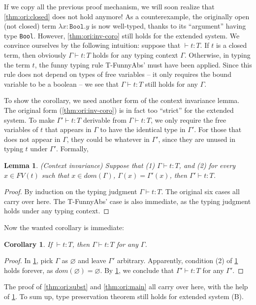 \documentclass[11pt]{article}
\newtheorem{lemma}{Lemma}
\newtheorem{corollary}{Corollary}
\let\t\texttt
\let\emptyset\varnothing
\newcommand{\Bool}{\t{Bool}}
\begin{document}
If we copy all the previous proof mechanism, we will soon realize that \cref{thm:ori:closed} does not hold anymore!
As a counterexample, the originally open (not closed) term $\lambda x:\Bool.y$ is now well-typed, thanks to its ``argument'' having type \Bool.
However, \cref{thm:ori:inv-coro} still holds for the extended system.
We convince ourselves by the following intuition: suppose that $\vdash t:T$.
If $t$ is a closed term, then obviously $\Gamma \vdash t:T$ holds for any typing context $\Gamma$.
Otherwise, in typing the term $t$, the funny typing rule T-FunnyAbs' must have been applied.
Since this rule does not depend on types of free variables -- it only requires the bound variable to be a boolean -- we see that $\Gamma \vdash t:T$ still holds for any $\Gamma$.

To show the corollary, we need another form of the context invariance lemma.
The original form (\cref{thm:ori:inv-coro}) is in fact too ``strict'' for the extended system.
To make $\Gamma' \vdash t:T$ derivable from $\Gamma \vdash t:T$, we only require the free variables of $t$ that appears in $\Gamma$ to have the identical type in $\Gamma'$.
For those that does not appear in $\Gamma$, they could be whatever in $\Gamma'$, since they are unused in typing $t$ under $\Gamma'$. Formally,
\begin{lemma}\label{thm:ext:inv}
    (Context invariance) Suppose that (1) $\Gamma \vdash t:T$, and (2) for every $x\in FV(t)$ such that $x\in dom(\Gamma)$, $\Gamma(x)=\Gamma'(x)$, then $\Gamma' \vdash t:T$.
\end{lemma}
\begin{proof}
    By induction on the typing judgment $\Gamma \vdash t:T$.
    The original six cases all carry over here.
    The T-FunnyAbs' case is also immediate, as the typing judgment holds under any typing context.
\end{proof}

Now the wanted corollary is immediate:
\begin{corollary}\label{thm:ext:inv-coro}
    If $\vdash t:T$, then $\Gamma \vdash t:T$ for any $\Gamma$.
\end{corollary}
\begin{proof}
    In \cref{thm:ext:inv}, pick $\Gamma$ as $\emptyset$ and leave $\Gamma'$ arbitrary.
    Apparently, condition (2) of \cref{thm:ext:inv} holds forever, as $dom(\emptyset)=\emptyset$.
    By \cref{thm:ext:inv}, we conclude that $\Gamma' \vdash t:T$ for any $\Gamma'$.
\end{proof}

The proof of \cref{thm:ori:subst} and \cref{thm:ori:main} all carry over here, with the help of \cref{thm:ext:inv-coro}.
To sum up, type preservation theorem still holds for extended system (B).
\end{document}
